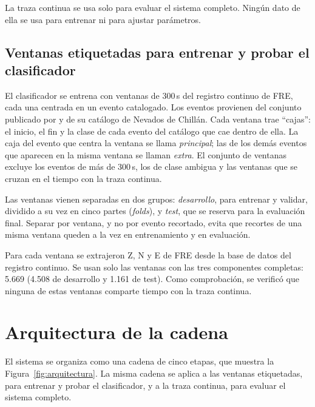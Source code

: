 La traza continua se usa solo para evaluar el sistema completo. Ningún dato de
ella se usa para entrenar ni para ajustar parámetros.

\subsection{Ventanas etiquetadas para entrenar y probar el clasificador}
\label{subsec:ventanas}

El clasificador se entrena con ventanas de 300\,s del registro continuo de FRE,
cada una centrada en un evento catalogado. Los eventos provienen del conjunto
publicado por \textcite{espinosacurilem2025dataset} y de su catálogo de
Nevados de Chillán. Cada ventana trae ``cajas'': el inicio, el fin y la clase
de cada evento del catálogo que cae dentro de ella. La caja del evento que
centra la ventana se llama \emph{principal}; las de los demás eventos que
aparecen en la misma ventana se llaman \emph{extra}. El conjunto de ventanas
excluye los eventos de más de 300\,s, los de clase ambigua y las ventanas que
se cruzan en el tiempo con la traza continua.

Las ventanas vienen separadas en dos grupos: \emph{desarrollo}, para entrenar
y validar, dividido a su vez en cinco partes (\emph{folds}), y \emph{test},
que se reserva para la evaluación final. Separar por ventana, y no por evento
recortado, evita que recortes de una misma ventana queden a la vez en
entrenamiento y en evaluación.

Para cada ventana se extrajeron Z, N y E de FRE desde la base de datos del
registro continuo. Se usan solo las ventanas con las tres componentes
completas: 5.669 (4.508 de desarrollo y 1.161 de test). Como comprobación, se
verificó que ninguna de estas ventanas comparte tiempo con la traza continua.

\section{Arquitectura de la cadena}
\label{sec:arquitectura-cadena}

El sistema se organiza como una cadena de cinco etapas, que muestra la
Figura~\ref{fig:arquitectura}. La misma cadena se aplica a las ventanas
etiquetadas, para entrenar y probar el clasificador, y a la traza continua,
para evaluar el sistema completo.

